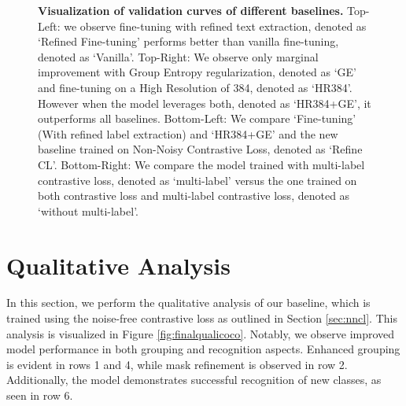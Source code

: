 \begin{figure}[t]
\caption[\textbf{Validation curves of baselines}]{\textbf{Visualization of validation curves of different baselines.} Top-Left: we observe fine-tuning with refined text extraction, denoted as `Refined Fine-tuning' performs better than vanilla fine-tuning, denoted as `Vanilla'. Top-Right: We observe only marginal improvement with Group Entropy regularization, denoted as `GE' and fine-tuning on a High Resolution of 384, denoted as `HR384'. However when the model leverages both, denoted as `HR384+GE', it outperforms all baselines. Bottom-Left: We compare `Fine-tuning' (With refined label extraction) and `HR384+GE' and the new baseline trained on Non-Noisy Contrastive Loss, denoted as `Refine CL'. Bottom-Right: We compare the model trained with multi-label contrastive loss, denoted as `multi-label' versus the one trained on both contrastive loss and multi-label contrastive loss, denoted as `without multi-label'.}

\label{fig:visualization}
\end{figure}

\section{Qualitative Analysis}
\label{sec:qa}
In this section, we perform the qualitative analysis of our baseline, which is trained using the noise-free contrastive loss as outlined in Section \ref{sec:nncl}. This analysis is visualized in Figure \ref{fig:finalqualicoco}. Notably, we observe improved model performance in both grouping and recognition aspects. Enhanced grouping is evident in rows 1 and 4, while mask refinement is observed in row 2. Additionally, the model demonstrates successful recognition of new classes, as seen in row 6.

